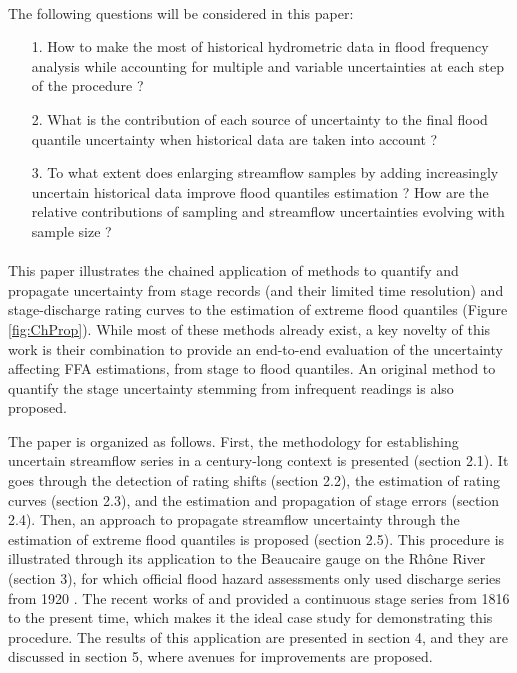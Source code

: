 \documentclass[11pt]{article}
\begin{document}
    \paragraph{}
    The following questions will be considered in this paper: 
    \begin{itemize}
        \item[1.] How to make the most of historical hydrometric data in flood frequency analysis while accounting for multiple and variable uncertainties at each step of the procedure ? 
        
        \item[2.] What is the contribution of each source of uncertainty to the final flood quantile uncertainty when historical data are taken into account ? 
        
        \item[3.] To what extent does enlarging streamflow samples by adding increasingly uncertain historical data improve flood quantiles estimation ? How are the relative contributions of sampling and streamflow uncertainties evolving with sample size ?
    \end{itemize}

    \paragraph{}
    This paper illustrates the chained application of methods to quantify and propagate uncertainty from stage records (and their limited time resolution) and stage-discharge rating curves to the estimation of extreme flood quantiles (Figure \ref{fig:ChProp}). While most of these methods already exist, a key novelty of this work is their combination to provide an end-to-end evaluation of the  uncertainty affecting FFA estimations, from stage to flood quantiles. An original method to quantify the stage uncertainty stemming from infrequent readings is also proposed.

    The paper is organized as follows. First, the methodology for establishing uncertain streamflow series in a century-long context is presented (section 2.1). It goes through the detection of rating shifts (section 2.2), the estimation of rating curves (section 2.3), and the estimation and propagation of stage errors (section 2.4). Then, an approach to propagate streamflow uncertainty through the estimation of extreme flood quantiles is proposed (section 2.5). This procedure is illustrated through its application to the Beaucaire gauge on the Rhône River (section 3), for which official flood hazard assessments only used discharge series from 1920 \citep{rigaudiere_etude_2000}. The recent works of \citet{pichard_hydro-climatology_2017} and \citet{bard_actualisation_2018} provided a continuous stage series from 1816 to the present time, which makes it the ideal case study for demonstrating this procedure. The results of this application are presented in section 4, and they are discussed in section 5, where avenues for improvements are proposed.
\end{document}
